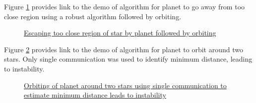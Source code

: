 \documentclass{report}[12pt]
\begin{document}

Figure \ref{fig:orbit_after_escape} provides link to the demo of algorithm for planet to go away from too close region using a robust algorithm followed by orbiting.
\begin{figure}[H]
    \centering
    \caption{\href{https://youtu.be/X6dGCLT0ho8}{Escaping too close region of star by planet followed by orbiting}}
    \label{fig:orbit_after_escape}
\end{figure}

Figure \ref{fig:orbit_two_star_comm1} provides link to the demo of algorithm for planet to orbit around two stars. Only single communication was used to identify minimum distance, leading to instability.
\begin{figure}[H]
    \centering
    \caption{\href{https://youtu.be/mhW04WvGKuQ}{Orbiting of planet around two stars using single communication to estimate minimum distance leads to instability}}
    \label{fig:orbit_two_star_comm1}
\end{figure}
\end{document}
